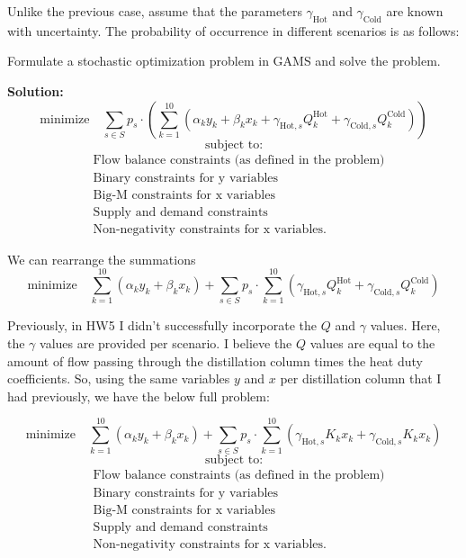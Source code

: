 \documentclass[11pt]{article}
\begin{document}
Unlike the previous case, assume that the parameters $\gamma_{\text{Hot}}$ and $\gamma_{\text{Cold}}$ are known with uncertainty. The probability of occurrence in different scenarios is as follows:




Formulate a stochastic optimization problem in GAMS and solve the problem.

\textbf{Solution:}
\[
\text{minimize} \quad \sum_{s \in S} p_s \cdot \left( \sum_{k=1}^{10} \left( \alpha_k y_k + \beta_k x_k + \gamma_{\text{Hot},s} Q_k^{\text{Hot}} + \gamma_{\text{Cold},s} Q_k^{\text{Cold}} \right) \right)
\]
\[
\text{subject to:}
\]
\[
\begin{aligned}
    & \text{Flow balance constraints (as defined in the problem)} \\
    & \text{Binary constraints for y variables} \\
    & \text{Big-M constraints for x variables} \\
    & \text{Supply and demand constraints} \\
    & \text{Non-negativity constraints for x variables.}
\end{aligned}
\]

We can rearrange the summations 
\[
\text{minimize} \quad \sum_{k=1}^{10} \left( \alpha_k y_k + \beta_k x_k \right) + \sum_{s \in S} p_s \cdot \sum_{k=1}^{10} \left( \gamma_{\text{Hot},s} Q_k^{\text{Hot}} + \gamma_{\text{Cold},s} Q_k^{\text{Cold}} \right)
\]

Previously, in HW5 I didn't successfully incorporate the $Q$ and $\gamma$ values.
Here, the $\gamma$ values are provided per scenario.
I believe the $Q$ values are equal to the amount of flow passing through the distillation column times the heat duty coefficients.
So, using the same variables $y$ and $x$ per distillation column that I had previously, we have the below full problem:


\[
    \text{minimize} \quad \sum_{k=1}^{10} \left( \alpha_k y_k + \beta_k x_k \right) + \sum_{s \in S} p_s \cdot \sum_{k=1}^{10} \left( \gamma_{\text{Hot},s} K_k x_k + \gamma_{\text{Cold},s} K_k x_k \right)
\]
\[
\text{subject to:}
\]
\[
\begin{aligned}
    & \text{Flow balance constraints (as defined in the problem)} \\
    & \text{Binary constraints for y variables} \\
    & \text{Big-M constraints for x variables} \\
    & \text{Supply and demand constraints} \\
    & \text{Non-negativity constraints for x variables.}
\end{aligned}
\]
\end{document}
